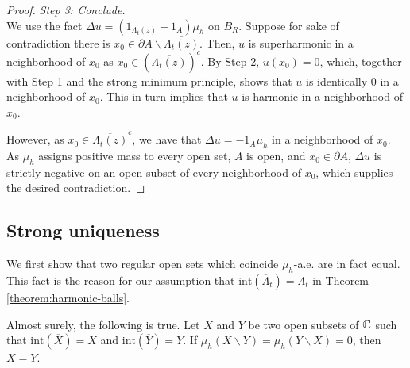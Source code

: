 \documentclass[12pt]{amsart}
\numberwithin{equation}{section}
\newcommand{\regcluster}[2]{\hyperref[eq:regular-cluster]{\Lambda^{#1}_{#2}}}
\begin{document}
\begin{proof}
		
		{\it Step 3: Conclude.} \\
		We use  the fact $\Delta u = (1_{{\regcluster{}{t}(z)}} - 1_{A}) \mu_h$ on $B_R$. 
		Suppose for sake of contradiction there is $x_0 \in \partial A \backslash \overline{{\regcluster{}{t}}(z)}$.
		Then, $u$ is superharmonic in a neighborhood of $x_0$ as $x_0 \in (\overline{{\regcluster{}{t}(z)}})^c$.
		By Step 2, $u(x_0) = 0$, which, together with Step 1 and the strong minimum principle, shows that $u$ is identically 0 in a neighborhood of $x_0$. 
		This in turn implies that $u$ is harmonic in a neighborhood of $x_0$. 
		
		However, as $x_0 \in \overline{{\regcluster{}{t}}(z)}^c$, we have that $\Delta u = -1_{A} \mu_h$ in a neighborhood of $x_0$. As $\mu_h$ assigns positive mass to every open set, $A$ is open, and $x_0 \in \partial A$, $\Delta u$ is strictly negative on an open subset of every neighborhood of $x_0$, which supplies the desired contradiction.
	\end{proof}
	
	
	
	
	
	\subsection{Strong uniqueness} 
	We first show that two regular open sets
	which coincide $\mu_h$-a.e. are in fact equal.
	This fact is the reason for our assumption that $\mathrm{int}(\overline{\Lambda}_t) = \Lambda_t$ in Theorem \ref{theorem:harmonic-balls}.
	
	\begin{lemma} \label{lemma:regular-open-ae}
		Almost surely, the following is true. Let $X$ and $Y$ be two open subsets of $\mathbb{C}$ such that  $\mathrm{int}(\overline{X}) = X$ and $\mathrm{int}(\overline{Y}) = Y$.
		If $\mu_h(X \backslash Y) = \mu_h(Y \backslash X) = 0$, then $X = Y$. 
	\end{lemma}
	
\end{document}
